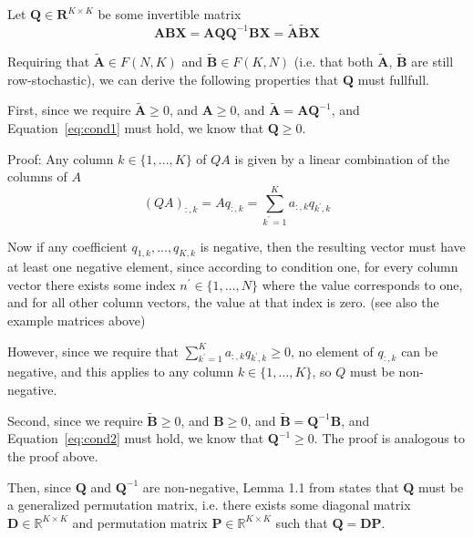 \documentclass{article}
\begin{document}
Let $\mathbf{Q} \in \mathbf{R}^{K \times K}$ be some invertible matrix
\begin{equation}
    \mathbf{A} \mathbf{B} \mathbf{X} = \mathbf{A} \mathbf{Q} \mathbf{Q}^{-1} \mathbf{B} \mathbf{X} = \tilde{\mathbf{A}} \tilde{\mathbf{B}} \mathbf{X}
\end{equation}

Requiring that $\tilde{\mathbf{A}} \in F(N, K)$ and $\tilde{\mathbf{B}} \in F(K, N)$ (i.e. that both $\tilde{\mathbf{A}}$, $\tilde{\mathbf{B}}$ are still row-stochastic), we can derive the following properties that $\mathbf{Q}$ must fullfull.

First, since we require $\tilde{\mathbf{A}} \geq 0$, and $\mathbf{A} \geq 0$, and $\tilde{\mathbf{A}} = \mathbf{A} \mathbf{Q}^{-1}$, and Equation~\eqref{eq:cond1} must hold, we know that $\mathbf{Q} \geq 0$.

Proof: Any column $k \in \{1, ..., K\}$ of $Q A$ is given by a linear combination of the columns of $A$
\begin{equation}
    (Q A)_{:, k} = A q_{:, k} = \sum_{k^\prime = 1}^K a_{:, k} q_{k^\prime, k}
\end{equation}

Now if any coefficient $q_{1, k}, ..., q_{K, k}$ is negative, then the resulting vector must have at least one negative element, since according to condition one, for every column vector there exists some index $n^\prime \in \{1, ..., N\}$ where the value corresponds to one, and for all other column vectors, the value at that index is zero. (see also the example matrices above)

However, since we require that $\sum_{k^\prime = 1}^K a_{:, k} q_{k^\prime, k} \geq 0$, no element of $q_{:, k}$ can be negative, and this applies to any column $k \in \{1, ..., K\}$, so $Q$ must be non-negative.

Second, since we require $\tilde{\mathbf{B}} \geq 0$, and $\mathbf{B} \geq 0$, and $\tilde{\mathbf{B}} = \mathbf{Q}^{-1} \mathbf{B}$, and Equation~\eqref{eq:cond2} must hold, we know that $\mathbf{Q}^{-1} \geq 0$. The proof is analogous to the proof above.

Then, since $\mathbf{Q}$ and $\mathbf{Q}^{-1}$ are non-negative, Lemma 1.1 from \textcite{mincNonnegativeMatrices1988} states that $\mathbf{Q}$ must be a generalized permutation matrix, i.e. there exists some diagonal matrix $\mathbf{D} \in \mathbb{R}^{K \times K}$ and permutation matrix $\mathbf{P} \in \mathbb{R}^{K \times K}$ such that $\mathbf{Q} = \mathbf{D} \mathbf{P}$.
\end{document}
